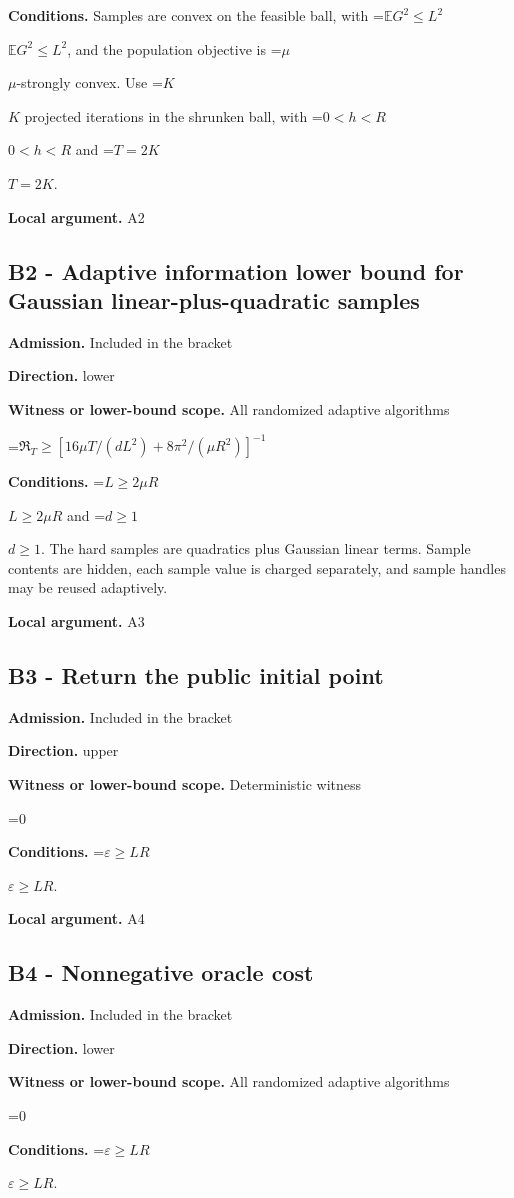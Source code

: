 \documentclass[10pt,a4paper]{article}
\newcommand{\AtlasMath}[1]{\par\begingroup\centering\setbox0=\hbox{$\displaystyle #1$}\ifdim\wd0>1.4\linewidth\typeout{ATLAS WIDE FORMULA: \the\wd0}\fi\ifdim\wd0>\linewidth\resizebox{\linewidth}{!}{\box0}\else\box0\fi\par\endgroup}
\newcommand{\AtlasInlineMath}[1]{\begingroup\setbox0=\hbox{$#1$}\ifdim\wd0>.4\linewidth\endgroup\AtlasMath{#1}\else\endgroup$#1$\fi}
\begin{document}
\textbf{Conditions.} Samples are convex on the feasible ball, with \AtlasInlineMath{\mathbb{E} G^2\le L^2}, and the population objective is \AtlasInlineMath{\mu}-strongly convex. Use \AtlasInlineMath{K} projected iterations in the shrunken ball, with \AtlasInlineMath{0<h<R} and \AtlasInlineMath{T=2K}.

\textbf{Local argument.} A2

\subsection{B2 - Adaptive information lower bound for Gaussian linear-plus-quadratic samples}
\textbf{Admission.} Included in the bracket

\textbf{Direction.} lower

\textbf{Witness or lower-bound scope.} All randomized adaptive algorithms

\AtlasMath{\mathfrak R_T\ge[16\mu T/(dL^2)+8\pi^2/(\mu R^2)]^{-1}}
\textbf{Conditions.} \AtlasInlineMath{L\ge2\mu R} and \AtlasInlineMath{d\ge1}. The hard samples are quadratics plus Gaussian linear terms. Sample contents are hidden, each sample value is charged separately, and sample handles may be reused adaptively.

\textbf{Local argument.} A3

\subsection{B3 - Return the public initial point}
\textbf{Admission.} Included in the bracket

\textbf{Direction.} upper

\textbf{Witness or lower-bound scope.} Deterministic witness

\AtlasMath{0}
\textbf{Conditions.} \AtlasInlineMath{\varepsilon\ge LR}.

\textbf{Local argument.} A4

\subsection{B4 - Nonnegative oracle cost}
\textbf{Admission.} Included in the bracket

\textbf{Direction.} lower

\textbf{Witness or lower-bound scope.} All randomized adaptive algorithms

\AtlasMath{0}
\textbf{Conditions.} \AtlasInlineMath{\varepsilon\ge LR}.
\end{document}
